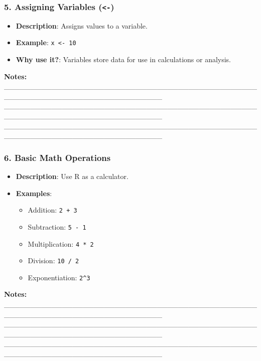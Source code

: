 \documentclass[
  11pt,
]{article}
\providecommand{\tightlist}{%
  \setlength{\itemsep}{0pt}\setlength{\parskip}{0pt}}
\begin{document}
\subsubsection{\texorpdfstring{5. Assigning Variables
(\texttt{\textless{}-})}{5. Assigning Variables (\textless-)}}\label{assigning-variables--}

\begin{itemize}
\tightlist
\item
  \textbf{Description}: Assigns values to a variable.
\item
  \textbf{Example}: \texttt{x\ \textless{}-\ 10}
\item
  \textbf{Why use it?}: Variables store data for use in calculations or
  analysis.
\end{itemize}

\textbf{Notes:}
\_\_\_\_\_\_\_\_\_\_\_\_\_\_\_\_\_\_\_\_\_\_\_\_\_\_\_\_\_\_\_\_\_\_\_\_\_\_\_\_\_\_\_\_\_\_\_\_\_\_\_\_\_\_\_\_\_\_\_\_\_\_\_\_\_\_\_\_\_\_\_\_\_\_\_\_\_\_
\_\_\_\_\_\_\_\_\_\_\_\_\_\_\_\_\_\_\_\_\_\_\_\_\_\_\_\_\_\_\_\_\_\_\_\_\_\_\_\_\_\_\_\_\_\_\_\_\_\_\_\_\_\_\_\_\_\_\_\_\_\_\_\_\_\_\_\_\_\_\_\_\_\_\_\_\_\_
\_\_\_\_\_\_\_\_\_\_\_\_\_\_\_\_\_\_\_\_\_\_\_\_\_\_\_\_\_\_\_\_\_\_\_\_\_\_\_\_\_\_\_\_\_\_\_\_\_\_\_\_\_\_\_\_\_\_\_\_\_\_\_\_\_\_\_\_\_\_\_\_\_\_\_\_\_\_

\subsubsection{6. Basic Math Operations}\label{basic-math-operations}

\begin{itemize}
\tightlist
\item
  \textbf{Description}: Use R as a calculator.
\item
  \textbf{Examples}:

  \begin{itemize}
  \tightlist
  \item
    Addition: \texttt{2\ +\ 3}
  \item
    Subtraction: \texttt{5\ -\ 1}
  \item
    Multiplication: \texttt{4\ *\ 2}
  \item
    Division: \texttt{10\ /\ 2}
  \item
    Exponentiation: \texttt{2\^{}3}
  \end{itemize}
\end{itemize}

\textbf{Notes:}
\_\_\_\_\_\_\_\_\_\_\_\_\_\_\_\_\_\_\_\_\_\_\_\_\_\_\_\_\_\_\_\_\_\_\_\_\_\_\_\_\_\_\_\_\_\_\_\_\_\_\_\_\_\_\_\_\_\_\_\_\_\_\_\_\_\_\_\_\_\_\_\_\_\_\_\_\_\_
\_\_\_\_\_\_\_\_\_\_\_\_\_\_\_\_\_\_\_\_\_\_\_\_\_\_\_\_\_\_\_\_\_\_\_\_\_\_\_\_\_\_\_\_\_\_\_\_\_\_\_\_\_\_\_\_\_\_\_\_\_\_\_\_\_\_\_\_\_\_\_\_\_\_\_\_\_\_
\_\_\_\_\_\_\_\_\_\_\_\_\_\_\_\_\_\_\_\_\_\_\_\_\_\_\_\_\_\_\_\_\_\_\_\_\_\_\_\_\_\_\_\_\_\_\_\_\_\_\_\_\_\_\_\_\_\_\_\_\_\_\_\_\_\_\_\_\_\_\_\_\_\_\_\_\_\_
\end{document}
